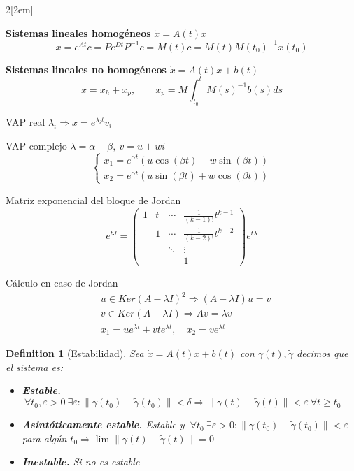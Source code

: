 \documentclass{myclass}
\newtheorem*{definition}{Definition}
\begin{document}
\begin{multicols}{2}[\columnsep2em]

\textbf{Sistemas lineales homogéneos} $\dot{x}=A(t)x$ 
\[
x = e^{At}c = Pe^{Dt}P^{-1}c = M(t)c = M(t)M(t_0)^{-1}x(t_0)
\] 

\textbf{Sistemas lineales no homogéneos} $\dot{x}=A(t)x + b(t)$ 
\[
x = x_h + x_p, \qquad x_p = M\int_{t_0}^t M(s)^{-1}b(s)ds
\] 

VAP real $\lambda_i \Rightarrow x = e^{\lambda_i t}v_i$

VAP complejo $\lambda = \alpha \pm \beta, \ v = u\pm wi$
\[
\begin{cases}
  x_1 = e^{\alpha t}(u\cos(\beta t)-w\sin(\beta t))\\
  x_2 = e^{\alpha t}(u\sin(\beta t)+w\cos(\beta t))
\end{cases}
\] 

Matriz exponencial del bloque de Jordan
\[
  e^{tJ} = \begin{pmatrix} 1 & t & \cdots & \frac{1}{(k-1)!}t^{k-1} \\ & 1 & \cdots & \frac{1}{(k-2)!}t^{k-2} \\ & & \ddots & \vdots \\ & & & 1  \end{pmatrix}  e^{t\lambda}
\] 

Cálculo en caso de Jordan
\begin{align*}
  &u \in Ker(A-\lambda I)^2 \Rightarrow (A-\lambda I)u = v\\
  &v \in Ker(A-\lambda I) \Rightarrow Av = \lambda v\\
  &x_1 = ue^{\lambda t} + vte^{\lambda t}, \quad x_2 = ve^{\lambda t}
\end{align*}

\begin{definition}[Estabilidad] Sea $\dot{x}=A(t)x+b(t)$ con $\gamma(t), \tilde{\gamma}$ decimos que el sistema es:
  \begin{itemize}[topsep=-6pt, itemsep=0pt]
    \item \textbf{Estable.} $\ \forall t_0, \varepsilon >0 \ \exists \varepsilon : \|\gamma(t_0)-\tilde{\gamma}(t_0)\|<\delta \Rightarrow \|\gamma(t)-\tilde{\gamma}(t)\|<\varepsilon \ \forall t\ge t_0$
 \item \textbf{Asintóticamente estable.} Estable y $\ \forall t_0 \ \exists \varepsilon >0: \|\gamma(t_0)-\tilde{\gamma}(t_0)\|<\varepsilon$ para algún $t_0 \Rightarrow \lim \|\gamma(t)-\tilde{\gamma}(t)\| =0$
   \item \textbf{Inestable.} Si no es estable
  \end{itemize}
\end{definition}


\end{multicols}
\end{document}
